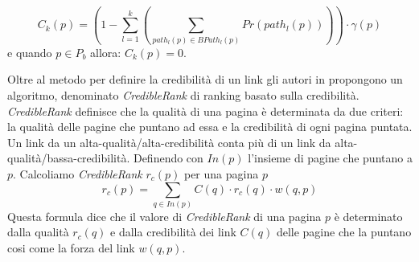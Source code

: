 \begin{equation} 
C_k(p)=\left ( 1 -\sum_{l=1}^k \left ( \sum_{path_l(p)\in BPath_l(p)} Pr(path_l(p)) \right ) \right ) \cdot\gamma(p)
\end{equation}
e quando \(p\in P_b\) allora: \(C_k(p)=0\).

Oltre al metodo per definire la credibilità di un link gli autori in \cite{Caverlee:2007:CWS:1281100.1281124} propongono un algoritmo, denominato \textit{CredibleRank} di ranking basato sulla credibilità. \textit{CredibleRank} definisce che la qualità di una pagina è determinata da due criteri: la qualità delle pagine che puntano ad essa e la credibilità di ogni pagina puntata. Un link da un alta-qualità/alta-credibilità conta più di un link da alta-qualità/bassa-credibilità. Definendo con \(In(p)\) l'insieme di pagine che puntano a \(p\). Calcoliamo \textit{CredibleRank} \(r_c(p)\) per una pagina \(p\)
\begin{equation}
r_c(p)=\sum_{q\in In(p)}C(q)\cdot r_c(q)\cdot w(q,p)
\end{equation}
Questa formula dice che il valore di \textit{CredibleRank} di una pagina \(p\) è determinato dalla qualità \(r_c(q)\) e dalla credibilità dei link \(C(q)\) delle pagine che la puntano cosi come la forza del link \(w(q,p)\).


